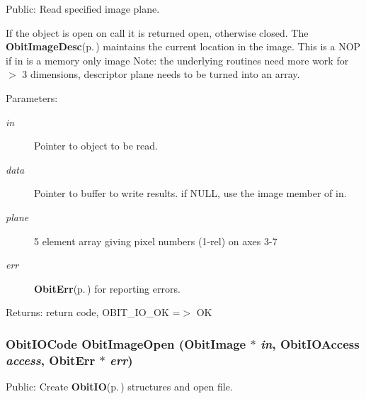 Public: Read specified image plane. 

If the object is open on call it is returned open, otherwise closed. The {\bf Obit\-Image\-Desc}{\rm (p.\,\pageref{structObitImageDesc})} maintains the current location in the image. This is a NOP if in is a memory only image Note: the underlying routines need more work for $>$ 3 dimensions, descriptor plane needs to be turned into an array. \begin{Desc}
\item[Parameters:]
\begin{description}
\item[{\em in}]Pointer to object to be read. \item[{\em data}]Pointer to buffer to write results. if NULL, use the image member of in. \item[{\em plane}]5 element array giving pixel numbers (1-rel) on axes 3-7 \item[{\em err}]{\bf Obit\-Err}{\rm (p.\,\pageref{structObitErr})} for reporting errors. \end{description}
\end{Desc}
\begin{Desc}
\item[Returns:]return code, OBIT\_\-IO\_\-OK =$>$ OK \end{Desc}
\subsubsection{\setlength{\rightskip}{0pt plus 5cm}Obit\-IOCode Obit\-Image\-Open ({\bf Obit\-Image} $\ast$ {\em in}, Obit\-IOAccess {\em access}, {\bf Obit\-Err} $\ast$ {\em err})}\label{ObitImage_8h_a29}


Public: Create {\bf Obit\-IO}{\rm (p.\,\pageref{structObitIO})} structures and open file. 


